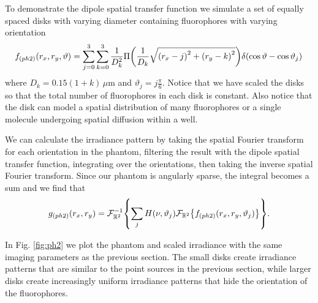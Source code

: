 \documentclass[]{osa-article}
\let\originalleft\left
\let\originalright\right
\renewcommand{\left}{\mathopen{}\mathclose\bgroup\originalleft}
\renewcommand{\right}{\aftergroup\egroup\originalright}
\providecommand{\mc}[1]{\mathcal{#1}}
\providecommand{\mbb}[1]{\mathbb{#1}}
\begin{document}
 To demonstrate the dipole spatial transfer function we simulate a set of
 equally spaced disks with varying diameter containing fluorophores with varying
 orientation
 \begin{align}
   f_{(ph2)}(r_x, r_y, \vartheta) = \sum_{j=0}^3 \sum_{k=0}^3 \frac{1}{D_k^2}\Pi\left(\frac{1}{D_k}\sqrt{\left(r_x - j\right)^2 + \left(r_y - k\right)^2}\right) \delta\left(\cos\vartheta - \cos\vartheta_j\right)\,\label{eq:phantom2}
 \end{align}
 where $D_k = 0.15(1+k)\, \mu$m and $\vartheta_j = j\frac{\pi }{6}$. Notice that
 we have scaled the disks so that the total number of fluorophores in each disk
 is constant. Also notice that the disk can model a spatial distribution of many
 fluorophores or a single molecule undergoing spatial diffusion within a well.  

 We can calculate the irradiance pattern by taking the spatial Fourier transform
 for each orientation in the phantom, filtering the result with the dipole
 spatial transfer function, integrating over the orientations, then taking the
 inverse spatial Fourier transform. Since our phantom is angularly sparse, the
 integral becomes a sum and we find that
 \begin{align}
   g_{(ph2)}(r_x, r_y) = \mc{F}^{-1}_{\mbb{R}^2}\left\{\sum_{j}H(\nu, \vartheta_j)\mc{F}_{\mbb{R}^2}\left\{f_{(ph2)}(r_x, r_y, \vartheta_j)\right\}\right\}.
 \end{align}

 In Fig. \ref{fig:ph2} we plot the phantom and scaled irradiance with the same
 imaging parameters as the previous section. The small disks create irradiance
 patterns that are similar to the point sources in the previous section, while
 larger disks create increasingly uniform irradiance patterns that hide the
 orientation of the fluorophores.
  
\end{document}
